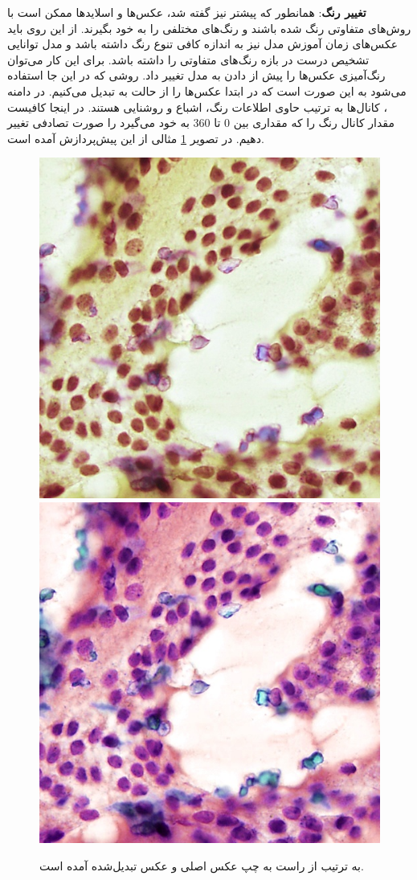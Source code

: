 \textbf{تغییر رنگ}:
همانطور که پیشتر نیز گفته شد، عکس‌ها و اسلاید‌ها ممکن است با روش‌های متفاوتی رنگ شده باشند و رنگ‌های مختلفی را به خود بگیرند.
از این روی باید عکس‌های زمان آموزش مدل نیز به اندازه کافی تنوع رنگ داشته باشد و مدل توانایی تشخیص درست در بازه رنگ‌های متفاوتی را داشته باشد.
برای این کار می‌توان رنگ‌آمیزی عکس‌ها را پیش از دادن به مدل تغییر داد.
روشی که در این جا استفاده می‌شود به این صورت است که در ابتدا عکس‌ها را از حالت  به  تبدیل می‌کنیم.
در دامنه ، کانال‌ها به ترتیب حاوی اطلاعات رنگ، اشباع و روشنایی هستند.
در اینجا کافیست مقدار کانال رنگ را که مقداری بین 0 تا 360 به خود می‌گیرد را صورت تصادفی تغییر دهیم.
در تصویر \ref{jitter augmentation} مثالی از این پیش‌پردازش آمده است.
\begin{figure}
    \begin{center}
        \includegraphics[width=0.48\linewidth]{figs/suggested_methods/subs/data_augmentation/jitter_1054-original.jpeg}
        \includegraphics[width=0.48\linewidth]{figs/suggested_methods/subs/data_augmentation/jitter_1054-transformed.jpeg}
    \end{center}
    \caption[نمونه‌ای از داده‌افزایی تغییر رنگ]{ به ترتیب از راست به چپ عکس اصلی و عکس تبدیل‌شده آمده است.}
    \label{jitter augmentation}
\end{figure}

